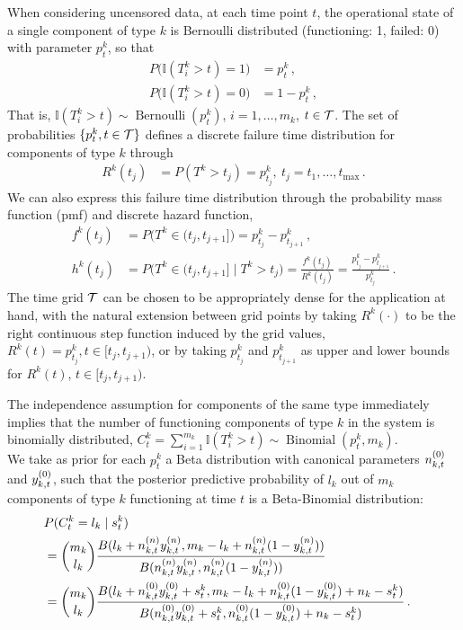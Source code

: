 \documentclass[12pt, a4paper]{elsarticle}
\newcommand{\indic}{\mathbb{I}}
\newcommand{\ber}{\operatorname{Bernoulli}}
\newcommand{\bin}{\operatorname{Binomial}}
\def\tmax{t_\text{max}}
\newcommand{\ptk}{p^k_t}
\begin{document}
When considering uncensored data,
at each time point $t$, the operational state of a single component of type $k$
is Bernoulli distributed (functioning: 1, failed: 0) with parameter $\ptk$, so that
\begin{align*}
P\big(\indic(T^k_i > t) = 1\big) &= \ptk\,, \\
P\big(\indic(T^k_i > t) = 0\big) &= 1 - \ptk\,,
\end{align*}
That is, $\indic(T^k_i > t) \sim \ber(\ptk)$, $i = 1, \ldots, m_k$, $t \in {\cal T}$.
The set of probabilities $\{ \ptk, t \in {\cal T}\}$
defines a discrete failure time distribution for components of type $k$ through
\begin{align*}
R^k(t_j) &= P(T^k > t_j) = p^k_{t_j},\ t_j = t_1, \ldots, \tmax\,.
\end{align*}
We can also express this failure time distribution through the probability mass function (pmf) and discrete hazard function,
\begin{align*}
f^k(t_j) &= P\big(T^k \in (t_j,t_{j+1}]\big) = p^k_{t_j} - p^k_{t_{j+1}}\,,\\ 
h^k(t_j) &= P\big(T^k \in (t_j,t_{j+1}]\mid T^k > t_j\big) %
          = \frac{f^k(t_j)}{R^k(t_j)}
          = \frac{p^k_{t_j} - p^k_{t_{j+1}}}{p^k_{t_j}}\,.
\end{align*}
The time grid $\cal T$ can be chosen to be appropriately dense for the application at hand,
with the natural extension between grid points by taking $R^k(\cdot)$ to be the right continuous step function induced by the grid values,
$R^k(t) = p^k_{t_j}, t \in [t_j, t_{j+1})$,
or by taking $p^k_{t_j}$ and $p^k_{t_{j+1}}$ as upper and lower bounds for $R^k(t)$, $t \in [t_j, t_{j+1})$.

The independence assumption for components of the same type immediately implies that 
the number of functioning components of type $k$ in the system
is binomially distributed, $C^k_t = \sum_{i=1}^{m_k} \indic(T^k_i > t) \sim \bin(\ptk, m_k)$.\\



We take as prior for each $\ptk$ a Beta distribution with canonical parameters $n^{(0)}_{k,t}$ and $y^{(0)}_{k,t}$,
such that the posterior predictive probability of $l_k$ out of $m_k$ components of type $k$ functioning at time $t$
is a Beta-Binomial distribution:
\begin{align}
\lefteqn{P(C^k_t = l_k \mid s^k_t)} \nonumber \\
 &= {m_k \choose l_k} \frac{B(l_k + \nn_{k,t}\yn_{k,t}, m_k - l_k + \nn_{k,t}(1-\yn_{k,t}))}
                           {B(\nn_{k,t}\yn_{k,t}, \nn_{k,t}(1-\yn_{k,t}))} \nonumber \\
 &= {m_k \choose l_k} \frac{B(l_k + \nktz\yktz + s^k_t, m_k - l_k + \nktz(1-\yktz) + n_k - s^k_t)}
                           {B(\nktz\yktz + s^k_t, \nktz(1-\yktz) + n_k - s^k_t)} \,.
\label{eq:postpredCny}
\end{align}
\end{document}
